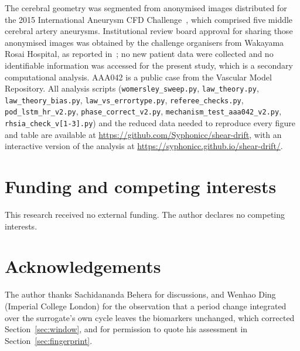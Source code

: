 \documentclass[11pt,a4paper]{article}
\begin{document}
The cerebral geometry was segmented from anonymised images distributed for
the 2015 International Aneurysm CFD Challenge~\cite{challenge2018}, which
comprised five middle cerebral artery aneurysms. Institutional review board
approval for sharing those anonymised images was obtained by the challenge
organisers from Wakayama Rosai Hospital, as reported
in~\cite{challenge2018}; no new patient data were collected and no
identifiable information was accessed for the present study, which is a
secondary computational analysis. AAA042 is a public case from the Vascular
Model Repository. All analysis
scripts (\texttt{womersley\_sweep.py}, \texttt{law\_theory.py},
\texttt{law\_theory\_bias.py}, \texttt{law\_vs\_errortype.py},
\texttt{referee\_checks.py}, \texttt{pod\_lstm\_hr\_v2.py},
\texttt{phase\_correct\_v2.py}, \texttt{mechanism\_test\_aaa042\_v2.py},
\texttt{rhsia\_check\_v[1-3].py}) and the reduced data needed to reproduce
every figure and table are available at
\url{https://github.com/Syphonicc/shear-drift}, with an interactive version
of the analysis at \url{https://syphonicc.github.io/shear-drift/}.

\section*{Funding and competing interests}

This research received no external funding. The author declares no competing
interests.

\section*{Acknowledgements}

The author thanks Sachidananda Behera for discussions, and Wenhao Ding
(Imperial College London) for the observation that a period change integrated
over the surrogate's own cycle leaves the biomarkers unchanged, which
corrected Section~\ref{sec:window}, and for permission to quote his
assessment in Section~\ref{sec:fingerprint}.
\end{document}
